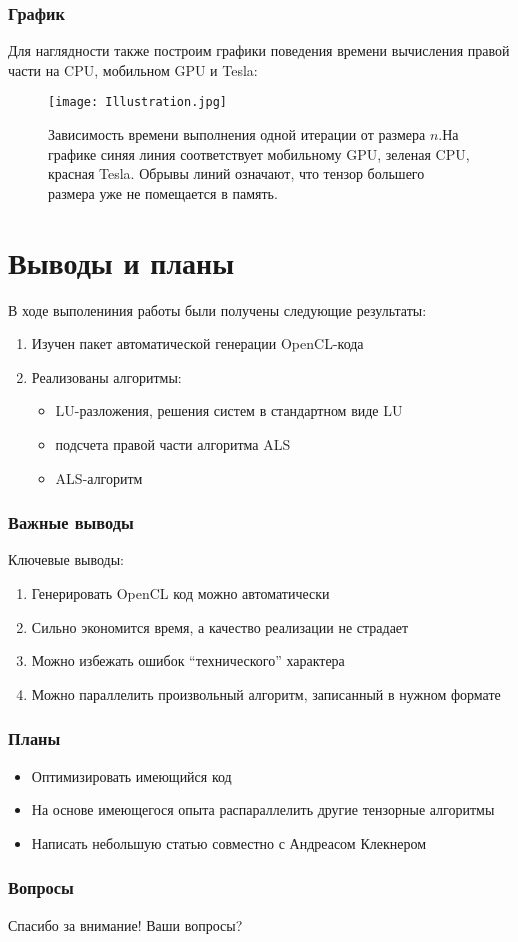 \documentclass[presentation]{beamer}
\begin{document}
\begin{frame}
\frametitle{График}
\label{sec-3-3}

Для наглядности также построим графики поведения времени вычисления правой части
на CPU, мобильном GPU и Tesla:

\begin{center}
\begin{figure}[H]
\centering
\texttt{[image: Illustration.jpg]}
\caption{Зависимость времени выполнения одной итерации от размера $n$.На графике синяя линия соответствует мобильному GPU, зеленая CPU, красная Tesla. Обрывы линий означают, что тензор большего размера уже не помещается в память.}
\end{figure}
\end{center}
\end{frame}
\section{Выводы и планы}
\label{sec-4}

В ходе выполениния работы были получены следующие результаты:
\begin{enumerate}
\item Изучен пакет автоматической генерации OpenCL-кода
\item Реализованы алгоритмы:
\begin{itemize}
\item LU-разложения, решения систем в стандартном виде LU
\item подсчета правой части алгоритма ALS
\item ALS-алгоритм
\end{itemize}
\end{enumerate}
\begin{frame}
\frametitle{Важные выводы}
\label{sec-4-1}

Ключевые выводы:
\begin{enumerate}
\item Генерировать OpenCL код можно автоматически
\item Сильно экономится время, а качество реализации не страдает
\item Можно избежать ошибок ``технического'' характера
\item Можно параллелить произвольный алгоритм, записанный в нужном формате
\end{enumerate}
\end{frame}
\begin{frame}
\frametitle{Планы}
\label{sec-4-2}

\begin{itemize}
\item Оптимизировать имеющийся код
\item На основе имеющегося опыта распараллелить другие тензорные алгоритмы
\item Написать небольшую статью совместно с Андреасом Клекнером
\end{itemize}
\end{frame}
\begin{frame}
\frametitle{Вопросы}
\label{sec-4-3}

Спасибо за внимание!
Ваши вопросы?
\end{frame}
\end{document}
